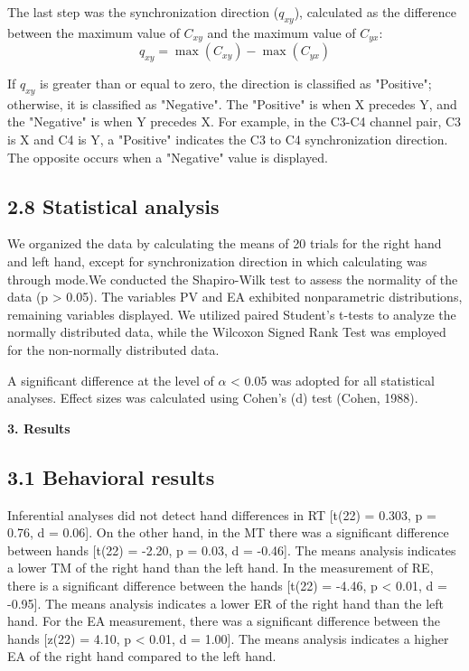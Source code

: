 \documentclass[man,a4paper,12pt,floatsintext]{apa6}
\begin{document}
The last step was the synchronization direction ($q_{xy}$), calculated as the difference between the maximum value of $C_{xy}$ and the maximum value of $C_{yx}$:
\[
q_{xy} = \max(C_{xy}) - \max(C_{yx})
\]

If $q_{xy}$ is greater than or equal to zero, the direction is classified as "Positive"; otherwise, it is classified as "Negative". The "Positive" is when X precedes Y, and the "Negative" is when Y precedes X. For example, in the C3-C4 channel pair, C3 is X and C4 is Y, a "Positive" indicates the C3 to C4 synchronization direction. The opposite occurs when a "Negative" value is displayed.  

\subsection{2.8 Statistical analysis}

We organized the data by calculating the means of 20 trials for the right hand and left hand, except for synchronization direction in which calculating was through mode.We conducted the Shapiro-Wilk test to assess the normality of the data (p > 0.05). The variables PV and EA exhibited nonparametric distributions, remaining variables displayed. We utilized paired Student's t-tests to analyze the normally distributed data, while the Wilcoxon Signed Rank Test was employed for the non-normally distributed data.

A significant difference at the level of $\alpha$ < 0.05 was adopted for all statistical analyses. Effect sizes was calculated using Cohen’s (d) test (Cohen, 1988).
	
\begin{flushleft}
\textbf{3. Results}
\end{flushleft}

\subsection{3.1 Behavioral results}

Inferential analyses did not detect hand differences in RT [t(22) = 0.303, p = 0.76, d = 0.06]. On the other hand, in the MT there was a significant difference between hands [t(22) = -2.20, p = 0.03, d = -0.46]. The means analysis indicates a lower TM of the right hand than the left hand. In the measurement of RE, there is a significant difference between the hands [t(22) = -4.46, p < 0.01, d = -0.95]. The means analysis indicates a lower ER of the right hand than the left hand. For the EA measurement, there was a significant difference between the hands [z(22) = 4.10, p < 0.01, d = 1.00]. The means analysis indicates a higher EA of the right hand compared to the left hand.
\end{document}
